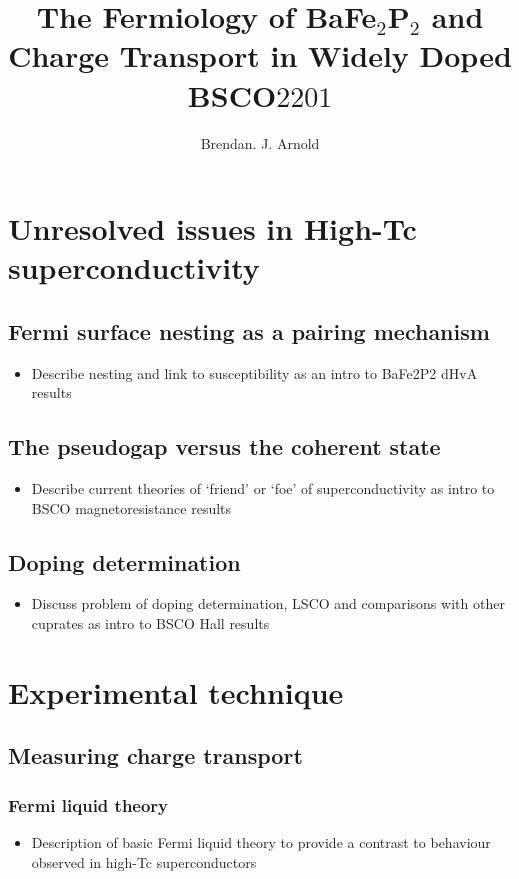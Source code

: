 \documentclass[11pt, a4paper]{article}
\title{The Fermiology of BaFe$_2$P$_2$ and Charge Transport in Widely Doped BSCO$2201$}
\author{Brendan. J. Arnold}
\begin{document}


\maketitle


\section{Unresolved issues in High-Tc superconductivity}
    \subsection{Fermi surface nesting as a pairing mechanism}
        \begin{itemize}
            \item Describe nesting and link to susceptibility as an intro to BaFe2P2 dHvA results
        \end{itemize}
    \subsection{The pseudogap versus the coherent state}
        \begin{itemize}
            \item Describe current theories of `friend' or `foe' of superconductivity as intro to BSCO magnetoresistance results
        \end{itemize}
    \subsection{Doping determination}
        \begin{itemize}
            \item Discuss problem of doping determination, LSCO and comparisons with other cuprates as intro to BSCO Hall results
        \end{itemize}


\section{Experimental technique}

    \subsection{Measuring charge transport}
        \subsubsection{Fermi liquid theory}
            \begin{itemize}
                \item Description of basic Fermi liquid theory to provide a contrast to behaviour observed in high-Tc superconductors
            \end{itemize}
\end{document}

